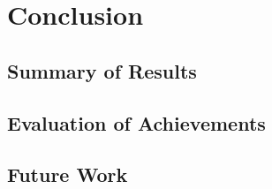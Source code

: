 \chapter{Conclusion}

\section{Summary of Results}


\section{Evaluation of Achievements}
\section{Future Work}

